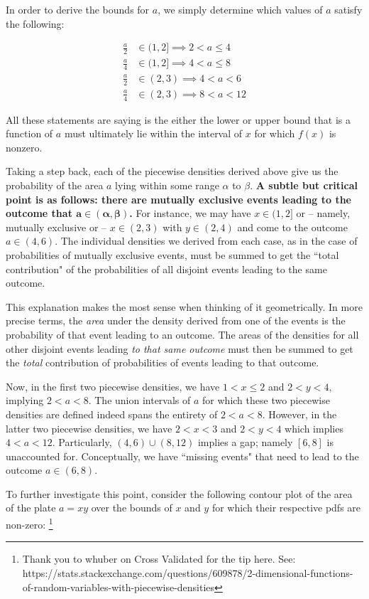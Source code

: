 \documentclass[10pt, oneside]{article}
\begin{document}
\begin{enumerate}[label=6.\arabic*]
In order to derive the bounds for $a$, we simply determine which values of $a$ satisfy the following:

\begin{align*}
\frac{a}{2} &\in (1, 2] \implies 2 < a \leq 4 \\
\frac{a}{4} &\in (1, 2] \implies 4 < a \leq 8 \\
\frac{a}{2} &\in (2,3) \implies 4 < a < 6 \\
\frac{a}{4} &\in (2,3) \implies 8 < a < 12
\end{align*}

All these statements are saying is the either the lower or upper bound that is a function of $a$ must ultimately lie within the interval of $x$ for which $f(x)$ is nonzero.

Taking a step back, each of the piecewise densities derived above give us the probability of the area $a$ lying within some range $\alpha$ to $\beta$. \textbf{A subtle but critical point is as follows: there are mutually exclusive events leading to the outcome that $\bm{a \in (\alpha,\beta)}$.} For instance, we may have $x \in (1,2]$ or -- namely, mutually exclusive or -- $x \in (2,3)$ with $y \in (2,4)$ and come to the outcome $a \in (4,6)$. The individual densities we derived from each case, as in the case of probabilities of mutually exclusive events, must be summed to get the ``total contribution" of the probabilities of all disjoint events leading to the same outcome. 

This explanation makes the most sense when thinking of it geometrically. In more precise terms, the \textit{area} under the density derived from one of the events is the probability of that event leading to an outcome. The areas of the densities for all other disjoint events leading \textit{to that same outcome} must then be summed to get the \textit{total} contribution of probabilities of events leading to that outcome.

Now, in the first two piecewise densities, we have $1 < x \leq 2$ and $2 < y < 4$, implying $2 < a < 8$. The union intervals of $a$ for which these two piecewise densities are defined indeed spans the entirety of $2 < a < 8$. However, in the latter two piecewise densities, we have $2 < x < 3$ and $2 < y < 4$ which implies $4 < a < 12$. Particularly, $(4, 6) \cup (8, 12)$ implies a gap; namely $[6,8]$ is unaccounted for. Conceptually, we have ``missing events" that need to lead to the outcome $a \in (6,8)$. 

To further investigate this point, consider the following contour plot of the area of the plate $a = xy$ over the bounds of $x$ and $y$ for which their respective pdfs are non-zero: \footnote{Thank you to whuber on Cross Validated for the tip here. See: https://stats.stackexchange.com/questions/609878/2-dimensional-functions-of-random-variables-with-piecewise-densities}


\end{enumerate}
\end{document}

